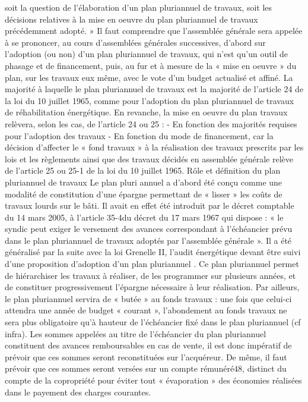 		soit la question de l'élaboration d'un plan pluriannuel de travaux, soit les décisions relatives à la mise en oeuvre du plan pluriannuel de travaux précédemment adopté. »
		Il faut comprendre que l’assemblée générale sera appelée à se prononcer, au cours d’assemblées générales successives, d’abord sur l’adoption (ou non) d’un plan pluriannuel de travaux, qui n’est qu’un outil de phasage et de financement, puis, au fur et à mesure de la « mise en oeuvre » du plan, sur les travaux eux même, avec le vote d’un budget actualisé et affiné.
		La majorité à laquelle le plan pluriannuel de travaux est la majorité de l’article 24 de la loi du 10 juillet 1965, comme pour l’adoption du plan pluriannuel de travaux de réhabilitation énergétique. En revanche, la mise en oeuvre du plan travaux relèvera, selon les cas, de l’article 24 ou 25 :
		- En fonction des majorités requises pour l’adoption des travaux
		- En fonction du mode de financement, car la décision d’affecter le « fond travaux » à la réalisation des travaux prescrits par les lois et les règlements ainsi que des travaux décidés en assemblée générale relève de l’article 25 ou 25-1 de la loi du 10 juillet 1965.
		Rôle et définition du plan pluriannuel de travaux
		Le plan pluri annuel a d’abord été conçu comme une modalité de constitution d’une épargne permettant de « lisser » les coûts de travaux lourds sur le bâti. Il avait en effet été introduit par le décret comptable du 14 mars 2005, à l’article 35-4\degres du décret du 17 mars 1967 qui dispose : « le syndic peut exiger le versement des avances correspondant à l’échéancier prévu dans le plan pluriannuel de travaux adoptés par l’assemblée générale ». Il a été généralisé par la suite avec la loi Grenelle II, l’audit énergétique devant être suivi d’une proposition d’adoption d’un plan pluriannuel .
		Ce plan pluriannuel permet de hiérarchiser les travaux à réaliser, de les programmer sur plusieurs années, et de constituer progressivement l’épargne nécessaire à leur réalisation. Par ailleurs, le plan pluriannuel servira de « butée » au fonds travaux : une fois que celui-ci attendra une année de budget « courant », l’abondement au fonds travaux ne sera plus obligatoire qu’à hauteur de l’échéancier fixé dans le plan pluriannuel (cf infra).
		Les sommes appelées au titre de l’échéancier du plan pluriannuel constituent des avances remboursables en cas de vente, il est donc impératif de prévoir que ces sommes seront reconstituées sur l’acquéreur. De même, il faut prévoir que ces sommes seront versées sur un compte rémunéré48, distinct du compte de la copropriété pour éviter tout « évaporation » des économies réalisées dans le payement des charges courantes.
